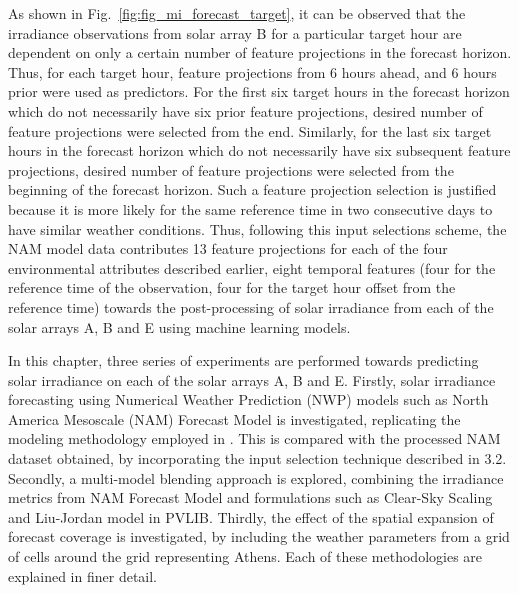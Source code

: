 \par As shown in Fig.~\ref{fig:fig_mi_forecast_target}, it can be observed that the irradiance observations from solar array B for a particular target hour are dependent on only a certain number of feature projections in the forecast horizon. Thus, for each target hour, feature projections from 6 hours ahead, and 6 hours prior were used as predictors. For the first six target hours in the forecast horizon which do not necessarily have six prior feature projections, desired number of feature projections were selected from the end. Similarly, for the last six target hours in the forecast horizon which do not necessarily have six subsequent feature projections, desired number of feature projections were selected from the beginning of the forecast horizon. Such a feature projection selection is justified because it is more likely for the same reference time in two consecutive days to have similar weather conditions. Thus, following this input selections scheme, the NAM model data contributes 13 feature projections for each of the four environmental attributes described earlier, eight temporal features (four for the reference time of the observation, four for the target hour offset from the reference time) towards the post-processing of solar irradiance from each of the solar arrays A, B and E using machine learning models.

\par In this chapter, three series of experiments are performed towards predicting solar irradiance on each of the solar arrays A, B and E. Firstly, solar irradiance forecasting using Numerical Weather Prediction (NWP) models such as North America Mesoscale (NAM) Forecast Model is investigated, replicating the modeling methodology employed in \cite{thesis_zach}. This is compared with the processed NAM dataset obtained, by incorporating the input selection technique described in 3.2. Secondly, a multi-model blending approach is explored, combining the irradiance metrics from NAM Forecast Model and formulations such as Clear-Sky Scaling and Liu-Jordan model in PVLIB. Thirdly, the effect of the spatial expansion of forecast coverage is investigated, by including the weather parameters from a grid of cells around the grid representing Athens. Each of these methodologies are explained in finer detail.

